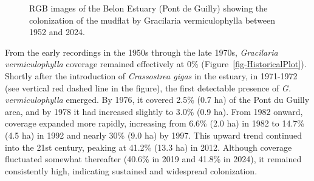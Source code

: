 \documentclass[
  letterpaper,
  DIV=11,
  numbers=noendperiod]{scrartcl}
\begin{document}
\label{cell-fig-HistoricalMap}
\begin{figure}[H]


\caption{\label{fig-HistoricalMap}RGB images of the Belon Estuary (Pont
de Guilly) showing the colonization of the mudflat by Gracilaria
vermiculophylla between 1952 and 2024.}

\end{figure}%

From the early recordings in the 1950s through the late 1970s,
\emph{Gracilaria vermiculophylla} coverage remained effectively at 0\%
(Figure~\ref{fig-HistoricalPlot}). Shortly after the introduction of
\emph{Crassostrea gigas} in the estuary, in 1971-1972 (see vertical red
dashed line in the figure), the first detectable presence of \emph{G.
vermiculophylla} emerged. By 1976, it covered 2.5\% (0.7 ha) of the Pont
du Guilly area, and by 1978 it had increased slightly to 3.0\% (0.9 ha).
From 1982 onward, coverage expanded more rapidly, increasing from 6.6\%
(2.0 ha) in 1982 to 14.7\% (4.5 ha) in 1992 and nearly 30\% (9.0 ha) by
1997. This upward trend continued into the 21st century, peaking at
41.2\% (13.3 ha) in 2012. Although coverage fluctuated somewhat
thereafter (40.6\% in 2019 and 41.8\% in 2024), it remained consistently
high, indicating sustained and widespread colonization.
\end{document}
